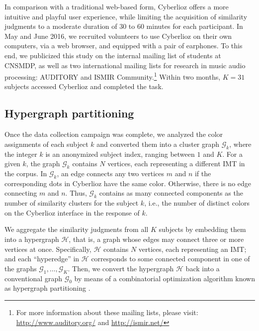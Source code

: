 \documentclass{bmcart}
\makeatletter
\newcommand*{\ie}{i.e.,\@\xspace}
\newcommand{\ipt}{IPT\xspace}
\makeatother
\begin{document}
In comparison with a traditional web-based form, Cyberlioz offers a more intuitive and playful user experience, while limiting the acquisition of similarity judgments to a moderate duration of $30$ to $60$ minutes for each participant.
In May and June 2016, we recruited volunteers to use Cyberlioz on their own computers, via a web browser, and equipped with a pair of earphones.
To this end, we publicized this study on the internal mailing list of students at CNSMDP, as well as two international mailing lists for research in music audio processing: AUDITORY  and ISMIR Community.\footnote{
For more information about these mailing lists, please visit:
\url{http://www.auditory.org/} and \url{http://ismir.net/}}
Within two months, $K=31$ subjects accessed Cyberlioz and completed the task.

\subsection*{Hypergraph partitioning}
Once the data collection campaign was complete, we analyzed the color assignments of each subject $k$ and converted them into a cluster graph $\mathcal{G}_k$, where the integer $k$ is an anonymized subject index, ranging between $1$ and $K$.
For a given $k$, the graph $\mathcal{G}_k$ contains $N$ vertices, each representing a different IMT in the corpus.
In $\mathcal{G}_k$, an edge connects any two vertices $m$ and $n$ if the corresponding dots in Cyberlioz have the same color.
Otherwise, there is no edge connecting $m$ and $n$.
Thus, $\mathcal{G}_k$ contains as many connected components as the number of similarity clusters for the subject $k$, \ie{} the number of distinct colors on the Cyberlioz interface in the response of $k$.


We aggregate the similarity judgments from all $K$ subjects by embedding them into a hypergraph $\mathcal{H}$, that is, a graph whose edges may connect three or more vertices at once.
Specifically, $\mathcal{H}$ contains $N$ vertices, each representing an IMT; and each ``hyperedge'' in $\mathcal{H}$ corresponds to some connected component in one of the graphs $\mathcal{G}_1, \ldots, \mathcal{G}_K$.
Then, we convert the hypergraph $\mathcal{H}$ back into a conventional graph $\mathcal{G}_0$ by means of a combinatorial optimization algorithm known as hypergraph partitioning \cite{kernighan1970efficient}.
\end{document}
